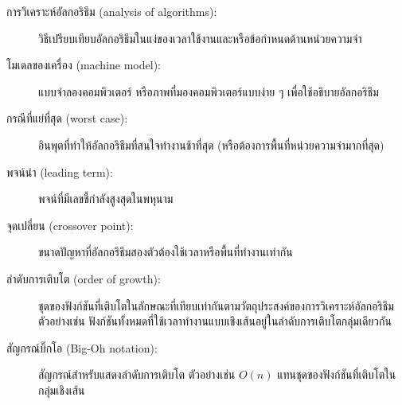 \begin{description}

\item[การวิเคราะห์อัลกอริธึม (analysis of algorithms):] วิธีเปรียบเทียบอัลกอริธึมในแง่ของเวลาใช้งานและหรือข้อกำหนดด้านหน่วยความจำ

\item[โมเดลของเครื่อง (machine model):] แบบจำลองคอมพิวเตอร์ หรือภาพที่มองคอมพิวเตอร์แบบง่าย ๆ เพื่อใช้อธิบายอัลกอริธึม

\item[กรณีที่แย่ที่สุด (worst case):] อินพุตที่ทำให้อัลกอริธึมที่สนใจทำงานช้าที่สุด (หรือต้องการพื้นที่หน่วยความจำมากที่สุด)

\item[พจน์นำ (leading term):] พจน์ที่มีเลขชี้กำลังสูงสุดในพหุนาม

\item[จุดเปลี่ยน (crossover point):] ขนาดปัญหาที่อัลกอริธึมสองตัวต้องใช้เวลาหรือพื้นที่ทำงานเท่ากัน

\item[ลำดับการเติบโต (order of growth):] ชุดของฟังก์ชันที่เติบโตในลักษณะที่เทียบเท่ากันตามวัตถุประสงค์ของการวิเคราะห์อัลกอริธึม 
ตัวอย่างเช่น ฟังก์ชันทั้งหมดที่ใช้เวลาทำงานแบบเชิงเส้นอยู่ในลำดับการเติบโตกลุ่มเดียวกัน

\item[สัญกรณ์บิ๊กโอ (Big-Oh notation):] สัญกรณ์สำหรับแสดงลำดับการเติบโต ตัวอย่างเช่น {\scriptsize$O(n)$} แทนชุดของฟังก์ชันที่เติบโตในกลุ่มเชิงเส้น


\end{description}
